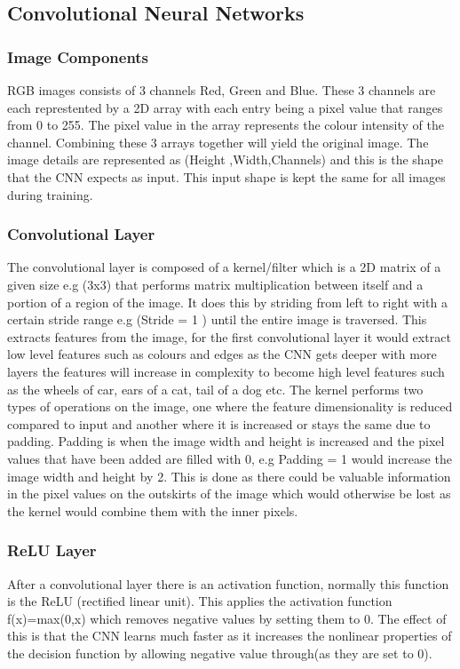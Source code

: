 \documentclass{csfyp}
\begin{document}
\subsection{Convolutional Neural Networks}
\subsubsection{Image Components}
RGB images consists of 3 channels Red, Green and Blue. These 3 channels are each represtented by a 2D array with each entry being a pixel value that ranges from 0 to 255. The pixel value in the array represents the colour intensity of the channel. Combining these 3 arrays together will yield the original image. The image details are represented as (Height ,Width,Channels) and this is the shape that the CNN expects as input. This input shape is kept the same for all images during training.


\subsubsection{Convolutional Layer}
The convolutional layer is composed of a kernel/filter which is a 2D matrix of a given size e.g (3x3) that performs matrix multiplication between itself and a portion of a region of the image. It does this by striding from left to right with a certain stride range e.g (Stride = 1 ) until the entire image is traversed. This extracts features from the image, for the first convolutional layer it would extract low level features such as colours and edges as the CNN gets deeper with more layers the features will increase in complexity to become high level features such as the wheels of car, ears of a cat, tail of a dog etc. The kernel performs two types of operations on the image, one where the feature dimensionality is reduced compared to input and another where it is increased or stays the same due to padding. Padding is when the image width and height is increased and the pixel values that have been added are filled with 0, e.g Padding = 1 would increase the image width and height by 2. This is done as there could be valuable information in the pixel values on the outskirts of the image which would otherwise be lost as the kernel would combine them with the inner pixels.

\subsubsection{ReLU Layer}
After a convolutional layer there is an activation function, normally this function is the ReLU (rectified linear unit). This applies the activation function f(x)=max(0,x) which removes negative values by setting them to 0. The effect of this is that the CNN learns much faster as it increases the nonlinear properties of the decision function by allowing negative value through(as they are set to 0).
\end{document}
